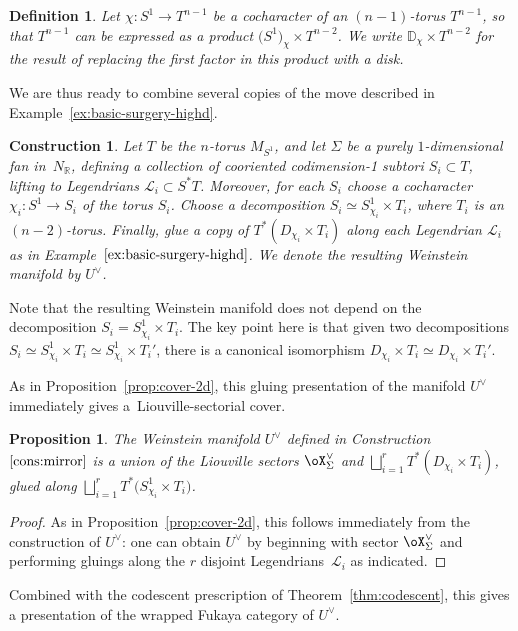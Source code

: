 \documentclass[10pt,a4paper]{amsart}
\numberwithin{equation}{section}
\newtheorem{Proposition}[Theorem]{Proposition}
\newtheorem{Construction}[Theorem]{Construction}
\newtheorem{Definition}[Theorem]{Definition}
\def\DD{\mathbb{D}}
\def\RR{\mathbb{R}}
\def\calL{\mathcal{L}}
\begin{document}
\begin{Definition}
 Let $\chi\colon S^1\to T^{n-1}$ be a cocharacter of an $(n-1)$-torus $T^{n-1}$, so that $T^{n-1}$ can be expressed as a product $\big(S^1\big)_\chi\times T^{n-2}$. We write $\DD_\chi\times T^{n-2}$ for the result of replacing the first factor in this product with a disk.
\end{Definition}

We are thus ready to combine several copies of the move described in Example~\ref{ex:basic-surgery-highd}.

\begin{Construction}\label{cons:mirror}
 Let $T$ be the $n$-torus $M_{S^1}$, and let $\Sigma$ be a purely $1$-dimensional fan in~$N_\RR$, defining a collection of cooriented codimension-1 subtori $S_i\subset T$, lifting to Legendrians $\calL_i\subset S^*T$. Moreover, for each $S_i$ choose a cocharacter $\chi_i\colon S^1 \to S_i$ of the torus $S_i$. Choose a decomposition $S_i \simeq S^1_{\chi_i} \times T_i$, where $T_i$ is an $(n-2)$-torus. Finally, glue a copy of $T^*(D_{\chi_i}\times T_i)$ along each Legendrian $\calL_i$ as in Example~$\ref{ex:basic-surgery-highd}$. We denote the resulting Weinstein manifold by $U^\vee$.
\end{Construction}

Note that the resulting Weinstein manifold does not depend on the decomposition $S_i = S^1_{\chi_i} \times T_i$. The key point here is that given two decompositions $S_i \simeq S^1_{\chi_i} \times T_i \simeq S^1_{\chi_i} \times T_i'$, there is a canonical isomorphism $D_{\chi_i}\times T_i \simeq D_{\chi_i} \times T_i'$.

As in Proposition~\ref{prop:cover-2d}, this gluing presentation of the manifold $U^\vee$ immediately gives a~Liou\-ville-sectorial cover.

\begin{Proposition}\label{prop:cover}
 The Weinstein manifold $U^\vee$ defined in Construction~$\ref{cons:mirror}$ is a union of the Liouville sectors $\oX_\Sigma^\vee$ and $\bigsqcup_{i=1}^r T^*(D_{\chi_i}\times T_i)$, glued along $\bigsqcup_{i=1}^r T^*\big(S^1_{\chi_i}\times T_i\big)$.
\end{Proposition}

\begin{proof}
 As in Proposition~\ref{prop:cover-2d}, this follows immediately from the construction of $U^\vee$: one can obtain $U^\vee$ by beginning with sector $\oX_\Sigma^\vee$ and performing gluings along the $r$ disjoint Legendrians~$\calL_i$ as indicated.
\end{proof}
Combined with the codescent prescription of Theorem~\ref{thm:codescent}, this gives a presentation of the wrapped Fukaya category of $U^\vee$.
\end{document}
